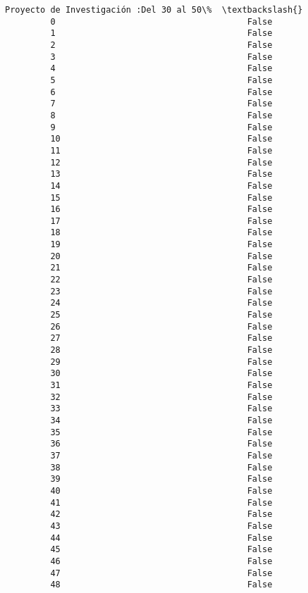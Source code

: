 \documentclass[11pt]{article}
\begin{document}
\begin{Verbatim}[commandchars=\\\{\}]
             Proyecto de Investigación :Del 30 al 50\%  \textbackslash{}
         0                                      False   
         1                                      False   
         2                                      False   
         3                                      False   
         4                                      False   
         5                                      False   
         6                                      False   
         7                                      False   
         8                                      False   
         9                                      False   
         10                                     False   
         11                                     False   
         12                                     False   
         13                                     False   
         14                                     False   
         15                                     False   
         16                                     False   
         17                                     False   
         18                                     False   
         19                                     False   
         20                                     False   
         21                                     False   
         22                                     False   
         23                                     False   
         24                                     False   
         25                                     False   
         26                                     False   
         27                                     False   
         28                                     False   
         29                                     False   
         30                                     False   
         31                                     False   
         32                                     False   
         33                                     False   
         34                                     False   
         35                                     False   
         36                                     False   
         37                                     False   
         38                                     False   
         39                                     False   
         40                                     False   
         41                                     False   
         42                                     False   
         43                                     False   
         44                                     False   
         45                                     False   
         46                                     False   
         47                                     False   
         48                                     False   
         

\end{Verbatim}
\end{document}
